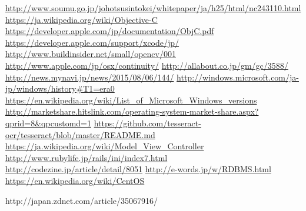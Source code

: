 \def\line{-\hspace*{-.7zw}-}

\begin{thebibliography}{99}

\url{http://www.soumu.go.jp/johotsusintokei/whitepaper/ja/h25/html/nc243110.html}
\url{https://ja.wikipedia.org/wiki/Objective-C}
\url{https://developer.apple.com/jp/documentation/ObjC.pdf}
\url{https://developer.apple.com/support/xcode/jp/}
\url{http://www.buildinsider.net/small/opencv/001}
\url{http://www.apple.com/jp/osx/continuity/}
\url{http://allabout.co.jp/gm/gc/3588/}
\url{http://news.mynavi.jp/news/2015/08/06/144/}
\url{http://windows.microsoft.com/ja-jp/windows/history#T1=era0}
\url{https://en.wikipedia.org/wiki/List_of_Microsoft_Windows_versions}
\url{http://marketshare.hitslink.com/operating-system-market-share.aspx?qprid=8&qpcustomd=1}
\url{https://github.com/tesseract-ocr/tesseract/blob/master/README.md}
\url{https://ja.wikipedia.org/wiki/Model_View_Controller}
\url{http://www.rubylife.jp/rails/ini/index7.html}
\url{http://codezine.jp/article/detail/8051}
\url{http://e-words.jp/w/RDBMS.html}
\url{https://en.wikipedia.org/wiki/CentOS}
\item{http://japan.zdnet.com/article/35067916/}

\end{thebibliography}